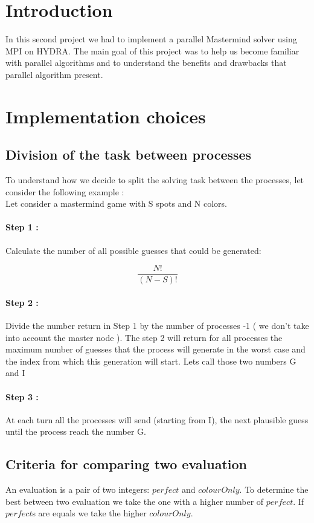 \section{Introduction}

In this second project we had to implement a parallel Mastermind solver using MPI on HYDRA.
The main goal of this project was to help us become familiar with parallel algorithms and to understand the benefits and drawbacks that parallel algorithm present.

\section{Implementation choices}
\subsection{Division of the task between processes}
To understand how we decide to split the solving task between the processes, let consider the following example : \\
Let consider a mastermind game with S spots and N colors.
\paragraph{Step 1 : } Calculate the number of all possible guesses that could be generated:

\[ \frac{N!}{(N-S)!} \]

\paragraph{Step 2 : } Divide the number return in Step 1 by the number of processes -1 ( we don't take into account the master node ). The step 2 will return for all processes the maximum number of guesses that the process will generate in the worst case and the index from which this generation will start. Lets call those two numbers G and I

\paragraph{Step 3 : } At each turn all the processes will send (starting from I), the next plausible guess until the process reach the number  G.

\subsection{Criteria for comparing two evaluation}
An evaluation is a pair of two integers: $perfect$ and $colourOnly$. To determine the best 
between two evaluation we take the one with a higher number of $perfect$. If $perfect$s are equals
we take the higher $colourOnly$.

